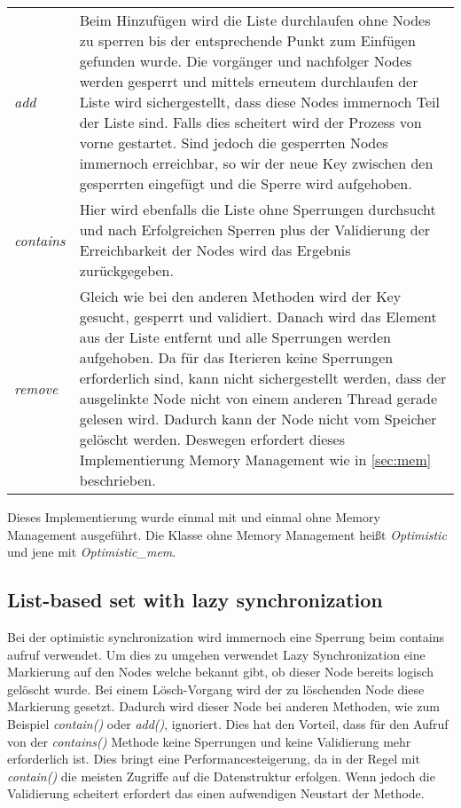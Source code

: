 \begin{table}[H]
    \begin{tabularx}{\textwidth}{lX}
		\textit{add} & Beim Hinzufügen wird die Liste durchlaufen ohne Nodes zu sperren bis der entsprechende Punkt zum Einfügen gefunden wurde. 
		Die vorgänger und nachfolger Nodes werden gesperrt und mittels erneutem durchlaufen der Liste wird sichergestellt, dass diese Nodes immernoch Teil der 
		Liste sind. Falls dies scheitert wird der Prozess von vorne gestartet. Sind jedoch die gesperrten Nodes immernoch erreichbar, so wir der neue Key 
		zwischen den gesperrten eingefügt und die Sperre wird aufgehoben.\\
		\textit{contains} & Hier wird ebenfalls die Liste ohne Sperrungen durchsucht und nach Erfolgreichen Sperren plus der Validierung der Erreichbarkeit 
		der Nodes wird das Ergebnis zurückgegeben.\\
		\textit{remove} & Gleich wie bei den anderen Methoden wird der Key gesucht, gesperrt und validiert. Danach wird das Element aus der Liste entfernt und 
		alle Sperrungen werden aufgehoben. Da für das Iterieren keine Sperrungen erforderlich sind, kann nicht sichergestellt werden, dass der ausgelinkte
		Node nicht von einem anderen Thread gerade gelesen wird. Dadurch kann der Node nicht vom Speicher gelöscht werden. Deswegen erfordert dieses Implementierung Memory Management wie in \ref{sec:mem} beschrieben. \\
    \end{tabularx}
\end{table}

Dieses Implementierung wurde einmal mit und einmal ohne Memory Management ausgeführt. Die Klasse ohne Memory Management heißt \textit{Optimistic} und jene mit \textit{Optimistic_mem}.

\subsection{List-based set with lazy synchronization}

Bei der optimistic synchronization wird immernoch eine Sperrung beim contains aufruf verwendet. 
Um dies zu umgehen verwendet Lazy Synchronization eine Markierung auf den Nodes welche bekannt gibt, ob dieser Node bereits logisch gelöscht wurde. 
Bei einem Lösch-Vorgang wird der zu löschenden Node diese Markierung gesetzt. Dadurch wird dieser Node bei anderen Methoden, 
wie zum Beispiel \textit{contain()} oder \textit{add()}, ignoriert. Dies hat den Vorteil, 
dass für den Aufruf von der \textit{contains()} Methode keine Sperrungen und keine Validierung mehr erforderlich ist.
Dies bringt eine Performancesteigerung, da in der Regel mit \textit{contain()} die meisten Zugriffe auf die Datenstruktur erfolgen.
Wenn jedoch die Validierung scheitert erfordert das einen aufwendigen Neustart der Methode. 


